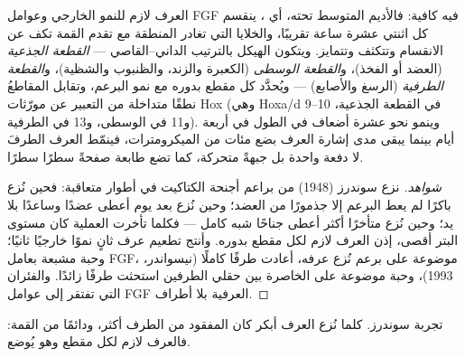 \begin{proposition}\label{prop:b2:limb-organogenesis:aer}
العرف لازم للنمو الخارجي وعوامل FGF فيه كافية: فالأديم
المتوسط تحته، أي \emph{}، ينقسم كل اثنتي عشرة
ساعة تقريبًا، والخلايا التي تغادر المنطقة مع تقدم القمة تكف
عن الانقسام وتتكثف وتتمايز. ويتكون الهيكل بالترتيب
الداني--القاصي --- \emph{القطعة الجذعية} (العضد أو الفخذ)،
و\emph{القطعة الوسطى} (الكعبرة والزند، والظنبوب والشظية)، و\emph{القطعة الطرفية}
(الرسغ والأصابع) --- ويُحدَّد كل مقطع بدوره مع نمو
البرعم، وتقابل المقاطعُ نطقًا متداخلة من التعبير عن مورّثات Hox
(وهي Hoxa/d 9--10 في القطعة الجذعية، و11 في الوسطى، و13 في
الطرفية). وينمو  نحو عشرة أضعاف في الطول في أربعة أيام
بينما يبقى مدى إشارة العرف بضع مئات من
الميكرومترات، فينمّط العرف الطرفَ لا دفعة واحدة بل
جبهةً متحركة، كما تضع طابعة صفحةً سطرًا سطرًا.
\end{proposition}
\begin{proof}[شواهد]
نزع سوندرز (1948)  من براعم أجنحة الكتاكيت في
أطوار متعاقبة: فحين نُزع باكرًا لم يعط البرعم إلا جذمورًا من العضد؛
وحين نُزع بعد يوم أعطى عضدًا وساعدًا بلا يد؛ وحين نُزع متأخرًا
أكثر أعطى جناحًا شبه كامل --- فكلما تأخرت العملية كان مستوى
البتر أقصى، إذن العرف لازم لكل مقطع بدوره. وأنتج
تطعيم عرف ثانٍ نموًا خارجيًا ثانيًا؛ وحبة مشبعة بعامل FGF،
موضوعة على برعم نُزع عرفه، أعادت طرفًا كاملًا (نيسواندر، 1993)، وحبة
موضوعة على الخاصرة بين حقلي الطرفين استحثت طرفًا زائدًا.
والفئران التي تفتقر إلى عوامل FGF العرفية بلا أطراف.
\end{proof}

\begin{omfigure}

{\small تجربة سوندرز. كلما نُزع العرف أبكر كان المفقود
من الطرف أكثر، ودائمًا من القمة: فالعرف لازم لكل مقطع
وهو يُوضع.}
\end{omfigure}

